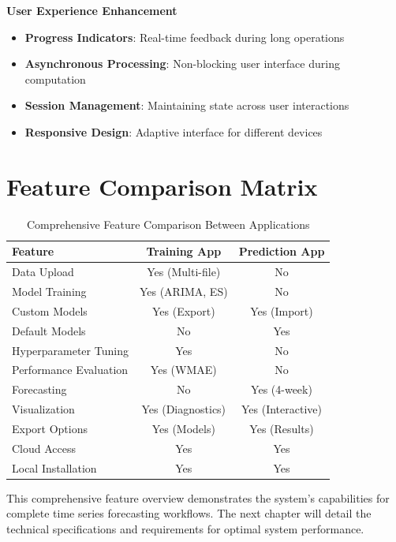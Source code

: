 \textbf{User Experience Enhancement}
\begin{itemize}
	\item \textbf{Progress Indicators}: Real-time feedback during long operations
	\item \textbf{Asynchronous Processing}: Non-blocking user interface during computation
	\item \textbf{Session Management}: Maintaining state across user interactions
	\item \textbf{Responsive Design}: Adaptive interface for different devices
\end{itemize}

\section{Feature Comparison Matrix}

\begin{table}[H]
	\centering
	\begin{tabularx}{\textwidth}{|X|c|c|}
		\hline
		\textbf{Feature} & \textbf{Training App} & \textbf{Prediction App} \\
		\hline
		Data Upload & Yes (Multi-file) & No \\
		Model Training & Yes (ARIMA, ES) & No \\
		Custom Models & Yes (Export) & Yes (Import) \\
		Default Models & No & Yes \\
		Hyperparameter Tuning & Yes & No \\
		Performance Evaluation & Yes (WMAE) & No \\
		Forecasting & No & Yes (4-week) \\
		Visualization & Yes (Diagnostics) & Yes (Interactive) \\
		Export Options & Yes (Models) & Yes (Results) \\
		Cloud Access & Yes & Yes \\
		Local Installation & Yes & Yes \\
		\hline
	\end{tabularx}
	\caption{Comprehensive Feature Comparison Between Applications}
	\label{tab:feature_comparison}
\end{table}

This comprehensive feature overview demonstrates the system's capabilities for complete time series forecasting workflows. The next chapter will detail the technical specifications and requirements for optimal system performance.